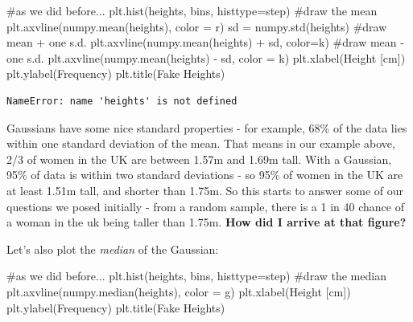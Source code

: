 \documentclass[
  letterpaper,
  DIV=11,
  numbers=noendperiod]{scrreprt}
\newenvironment{Shaded}{\begin{snugshade}}{\end{snugshade}}
\newcommand{\CommentTok}[1]{\textcolor[rgb]{0.37,0.37,0.37}{#1}}
\newcommand{\NormalTok}[1]{\textcolor[rgb]{0.00,0.23,0.31}{#1}}
\newcommand{\OperatorTok}[1]{\textcolor[rgb]{0.37,0.37,0.37}{#1}}
\newcommand{\StringTok}[1]{\textcolor[rgb]{0.13,0.47,0.30}{#1}}
\begin{document}
\begin{Shaded}
\begin{Highlighting}[]
\CommentTok{\#as we did before...}
\NormalTok{plt.hist(heights, bins, histtype}\OperatorTok{=}\StringTok{\textquotesingle{}step\textquotesingle{}}\NormalTok{)}
\CommentTok{\#draw the mean}
\NormalTok{plt.axvline(numpy.mean(heights), color }\OperatorTok{=} \StringTok{\textquotesingle{}r\textquotesingle{}}\NormalTok{)}
\NormalTok{sd }\OperatorTok{=}\NormalTok{ numpy.std(heights)}
\CommentTok{\#draw mean + one s.d.}
\NormalTok{plt.axvline(numpy.mean(heights) }\OperatorTok{+}\NormalTok{ sd, color}\OperatorTok{=}\StringTok{\textquotesingle{}k\textquotesingle{}}\NormalTok{)}
\CommentTok{\#draw mean {-} one s.d.}
\NormalTok{plt.axvline(numpy.mean(heights) }\OperatorTok{{-}}\NormalTok{ sd, color }\OperatorTok{=} \StringTok{\textquotesingle{}k\textquotesingle{}}\NormalTok{)}
\NormalTok{plt.xlabel(}\StringTok{\textquotesingle{}Height [cm]\textquotesingle{}}\NormalTok{)}
\NormalTok{plt.ylabel(}\StringTok{\textquotesingle{}Frequency\textquotesingle{}}\NormalTok{)}
\NormalTok{plt.title(}\StringTok{\textquotesingle{}Fake Heights\textquotesingle{}}\NormalTok{)}
\end{Highlighting}
\end{Shaded}

\begin{verbatim}
NameError: name 'heights' is not defined
\end{verbatim}

Gaussians have some nice standard properties - for example, 68\% of the
data lies within one standard deviation of the mean. That means in our
example above, 2/3 of women in the UK are between 1.57m and 1.69m tall.
With a Gaussian, 95\% of data is within two standard deviations - so
95\% of women in the UK are at least 1.51m tall, and shorter than 1.75m.
So this starts to answer some of our questions we posed initially - from
a random sample, there is a 1 in 40 chance of a woman in the uk being
taller than 1.75m. \textbf{How did I arrive at that figure?}

Let's also plot the \emph{median} of the Gaussian:

\begin{Shaded}
\begin{Highlighting}[]
\CommentTok{\#as we did before...}
\NormalTok{plt.hist(heights, bins, histtype}\OperatorTok{=}\StringTok{\textquotesingle{}step\textquotesingle{}}\NormalTok{)}
\CommentTok{\#draw the median}
\NormalTok{plt.axvline(numpy.median(heights), color }\OperatorTok{=} \StringTok{\textquotesingle{}g\textquotesingle{}}\NormalTok{)}
\NormalTok{plt.xlabel(}\StringTok{\textquotesingle{}Height [cm]\textquotesingle{}}\NormalTok{)}
\NormalTok{plt.ylabel(}\StringTok{\textquotesingle{}Frequency\textquotesingle{}}\NormalTok{)}
\NormalTok{plt.title(}\StringTok{\textquotesingle{}Fake Heights\textquotesingle{}}\NormalTok{)}
\end{Highlighting}
\end{Shaded}
\end{document}
